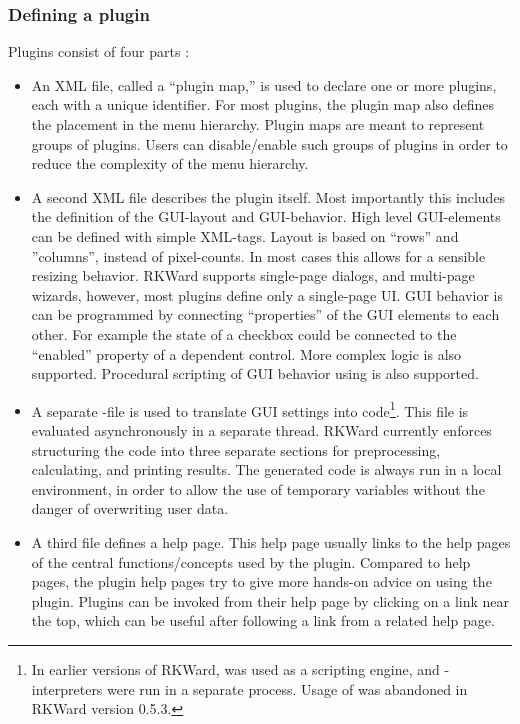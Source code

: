 \subsubsection{Defining a plugin}
\label{sec:technical_plugins_defining}
Plugins consist of four parts \citep[see Section~\ref{sec:example_plugin} for an example; for a complete
manual, see][]{Friedrichsmeier2010}:

\begin{itemize}
    \item
    An XML file, called a ``plugin map,'' is used to declare one or more plugins, each
    with a unique identifier. For most plugins, the plugin map also defines the
    placement in the menu hierarchy. Plugin maps are meant to represent groups of
    plugins. Users can disable/enable such groups of plugins in order to reduce the
    complexity of the menu hierarchy.

    \item
    A second XML file describes the plugin itself. Most importantly this includes
    the definition of the GUI-layout and GUI-behavior. High level GUI-elements can
    be defined with simple XML-tags. Layout is based on ``rows'' and ''columns'',
    instead of pixel-counts. In most cases this allows for a sensible resizing
    behavior. RKWard supports single-page dialogs, and multi-page wizards, however,
    most plugins define only a single-page UI. GUI behavior is can be programmed by
    connecting ``properties'' of the GUI elements to each other. For example the state
    of a checkbox could be connected to the ``enabled'' property of a dependent
    control. More complex logic is also supported. Procedural scripting of GUI
    behavior using  is also supported.

    \item
    A separate -file is used to translate GUI settings into 
    code\footnote{
        In earlier versions of RKWard,  was used
        as a scripting engine, and -interpreters were run in a separate process.
        Usage of  was abandoned in RKWard version 0.5.3.
    }. This  file is evaluated asynchronously in a separate thread. RKWard
    currently enforces structuring the code into three separate sections for
    preprocessing, calculating, and printing results. The generated code is always
    run in a local environment, in order to allow the use of temporary variables
    without the danger of overwriting user data.

    \item
    A third  file defines a help page. This help page usually links to the  help
    pages of the central functions/concepts used by the plugin. Compared to  help
    pages, the plugin help pages try to give more hands-on advice on using the
    plugin. Plugins can be invoked from their help page by clicking on a link near
    the top, which can be useful after following a link from a related help page.
\end{itemize}

